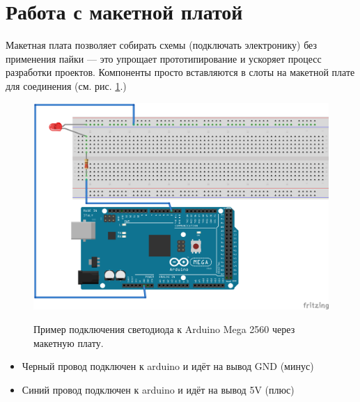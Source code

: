\documentclass[a4paper,twoside]{book}
\begin{document}






\section{Работа с макетной платой}

Макетная плата позволяет собирать схемы (подключать электронику) без применения
пайки --- это упрощает прототипирование и ускоряет процесс разработки проектов.
Компоненты просто вставляются в слоты на макетной плате для соединения
(см. рис. \ref{fig:breadboard-led}.)

\begin{figure}[ht]
  \centering
  \caption{Пример подключения светодиода к Arduino Mega 2560 через макетную
    плату.}
  \includegraphics[width=12cm]{schematics/001-led}
  \label{fig:breadboard-led}
\end{figure}

\begin{itemize}
\item Черный провод подключен к arduino и идёт на вывод GND (минус)
\item Синий провод подключен к arduino и идёт на вывод 5V (плюс)
\end{itemize}

\end{document}
